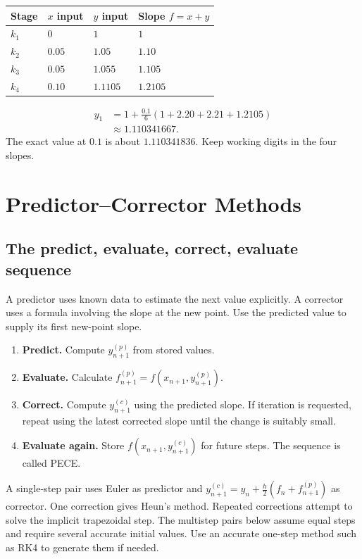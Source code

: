 \documentclass[12pt,a4paper]{article}
\begin{document}
\begin{tcolorbox}[examplebox, title={RK4 stage table on the same IVP}]
\par\vspace{5pt}
\begingroup
\setlength{\extrarowheight}{1pt}
\noindent\begin{tabularx}{\linewidth}{|B{1.7cm}|Y|Y|Y|}
\hline
\textbf{Stage} & \textbf{$x$ input} & \textbf{$y$ input} & \textbf{Slope $f=x+y$} \\ \hline
$k_1$ & $0$ & $1$ & $1$ \\ \hline
$k_2$ & $0.05$ & $1.05$ & $1.10$ \\ \hline
$k_3$ & $0.05$ & $1.055$ & $1.105$ \\ \hline
$k_4$ & $0.10$ & $1.1105$ & $1.2105$ \\ \hline
\end{tabularx}\par
\endgroup
\[
\begin{aligned}
y_1&=1+\frac{0.1}{6}(1+2.20+2.21+1.2105)\\
   &\approx1.110341667.
\end{aligned}
\]
The exact value at $0.1$ is about $1.110341836$. Keep working digits in the four slopes.
\end{tcolorbox}

\section{Predictor--Corrector Methods}
\subsection{The predict, evaluate, correct, evaluate sequence}
\begin{tcolorbox}[defbox, title={Predictor and corrector}]
A predictor uses known data to estimate the next value explicitly. A corrector uses a formula involving the slope at the new point. Use the predicted value to supply its first new-point slope.
\end{tcolorbox}

\begin{enumerate}[leftmargin=*, itemsep=3pt, topsep=4pt]
  \item \textbf{Predict.} Compute $y_{n+1}^{(p)}$ from stored values.
  \item \textbf{Evaluate.} Calculate $f_{n+1}^{(p)}=f(x_{n+1},y_{n+1}^{(p)})$.
  \item \textbf{Correct.} Compute $y_{n+1}^{(c)}$ using the predicted slope. If iteration is requested, repeat using the latest corrected slope until the change is suitably small.
  \item \textbf{Evaluate again.} Store $f(x_{n+1},y_{n+1}^{(c)})$ for future steps. The sequence is called PECE.
\end{enumerate}
A single-step pair uses Euler as predictor and $y_{n+1}^{(c)}=y_n+\tfrac h2(f_n+f_{n+1}^{(p)})$ as corrector. One correction gives Heun's method. Repeated corrections attempt to solve the implicit trapezoidal step. The multistep pairs below assume equal steps and require several accurate initial values. Use an accurate one-step method such as RK4 to generate them if needed.
\end{document}

